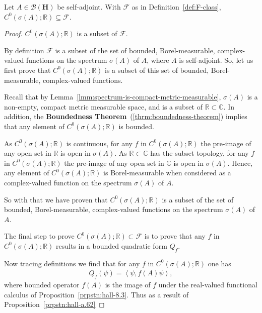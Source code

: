 \begin{proposition}
    \label{prpstn:F-contains-continuous}
    \leanok
    Let $A \in \mathcal{B}(\mathbf{H})$ be self-adjoint. With $\mathcal{F}$ as in Definition~\ref{def:F-class}, $C^0(\sigma(A); \mathbb{R}) \subseteq \mathcal{F}$.
\end{proposition}
\begin{proof}
    \leanok
$C^0(\sigma(A); \mathbb{R})$ is a subset of $\mathcal{F}$.

By definition $\mathcal{F}$ is a subset of the set of bounded, Borel-measurable, complex-valued functions on the spectrum $\sigma(A)$ of $A$, where $A$ is self-adjoint. So, let us first prove that $C^0(\sigma(A); \mathbb{R})$ is a subset of this set of bounded, Borel-measurable, complex-valued functions.

Recall that by Lemma~\ref{lmm:spectrum-is-compact-metric-measurable}, $\sigma(A)$ is a non-empty, compact metric measurable space, and is a subset of $\mathbb{R} \subset \mathbb{C}$. In addition, the \textbf{Boundedness Theorem}~(\ref{thrm:boundedness-theorem}) implies that any element of $C^0(\sigma(A); \mathbb{R})$ is bounded.

As $C^0(\sigma(A); \mathbb{R})$ is continuous, for any $f$ in $C^0(\sigma(A); \mathbb{R})$ the pre-image of any open set in $\mathbb{R}$ is open in $\sigma(A)$. As $\mathbb{R} \subset \mathbb{C}$ has the subset topology, for any $f$ in $C^0(\sigma(A); \mathbb{R})$ the pre-image of any open set in $\mathbb{C}$ is open in $\sigma(A)$. Hence, any element of $C^0(\sigma(A); \mathbb{R})$ is Borel-measurable when considered as a complex-valued function on the spectrum $\sigma(A)$ of $A$.

So with that we have proven that $C^0(\sigma(A); \mathbb{R})$ is a subset of the set of bounded, Borel-measurable, complex-valued functions on the spectrum $\sigma(A)$ of $A$.

The final step to prove $C^0(\sigma(A); \mathbb{R}) \subset \mathcal{F}$ is to prove that any $f$ in $C^0(\sigma(A); \mathbb{R})$ results in a bounded quadratic form $Q_f$.

Now tracing definitions we find that for any $f$ in $C^0(\sigma(A); \mathbb{R})$ one has
\begin{align}
    Q_f(\psi) = \left< \psi, f(A)\psi \right>,
\end{align}
where bounded operator $f(A)$ is the image of $f$ under the real-valued functional calculus of Proposition~\ref{prpstn:hall-8.3}. Thus as a result of Proposition~\ref{prpstn:hall-a.62}


\end{proof}
